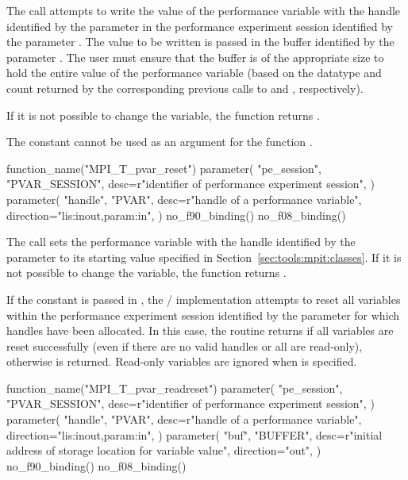 The  call attempts to write the value of the
performance variable with the handle identified by the parameter
 in the performance experiment session identified by the parameter
.  The value to be written is passed in the buffer
identified by the parameter .  The user must ensure that the
buffer is of the appropriate size to hold the entire value of the
performance variable (based on the datatype and count returned by the
corresponding previous calls to  and
, respectively).

If it is not possible to change the variable, the function returns
.

The constant  cannot be used as an
argument for the  function .

\begin{mpi-binding}
    function_name("MPI_T_pvar_reset")
    parameter(
        "pe_session",
        "PVAR_SESSION",
        desc=r"identifier of performance experiment session",
    )
    parameter(
        "handle",
        "PVAR",
        desc=r"handle of a performance variable",
        direction="lis:inout,param:in",
    )
    no_f90_binding()
    no_f08_binding()
\end{mpi-binding}

The  call sets the performance variable with
the handle identified by the parameter  to its starting
value specified in Section~\ref{sec:tools:mpit:classes}.  If it is not
possible to change the variable, the function returns
.

If the constant  is passed in
, the \MPI/ implementation attempts to reset all variables
within the performance experiment session identified by the parameter  for which
handles have been allocated.  In this case, the routine returns
 if all variables are reset successfully (even if there
are no valid handles or all are read-only), otherwise
 is returned.  Read-only variables are
ignored when  is specified.


\begin{mpi-binding}
    function_name("MPI_T_pvar_readreset")
    parameter(
        "pe_session",
        "PVAR_SESSION",
        desc=r"identifier of performance experiment session",
    )
    parameter(
        "handle",
        "PVAR",
        desc=r"handle of a performance variable",
        direction="lis:inout,param:in",
    )
    parameter(
        "buf",
        "BUFFER",
        desc=r"initial address of storage location for variable value",
        direction="out",
    )
    no_f90_binding()
    no_f08_binding()
\end{mpi-binding}

